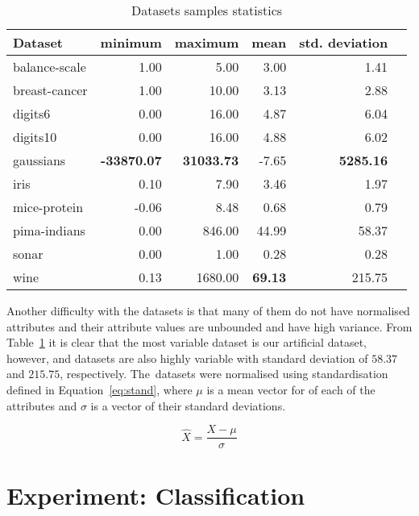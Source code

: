 \begin{table}[ht] \centering
\begin{tabular}{lrrrrr}
\hline
Dataset & minimum & maximum & mean & std. deviation \\
\hline
balance-scale           & 1.00  & 5.00    & 3.00  & 1.41 \\
breast-cancer           & 1.00  & 10.00   & 3.13  & 2.88 \\
digits6                 & 0.00  & 16.00   & 4.87  & 6.04 \\
digits10                & 0.00  & 16.00   & 4.88  & 6.02 \\
gaussians               & \textbf{-33870.07} & \textbf{31033.73} & -7.65 & \textbf{5285.16} \\
iris                    & 0.10  & 7.90    & 3.46  & 1.97 \\
mice-protein            & -0.06 & 8.48    & 0.68  & 0.79 \\
pima-indians            & 0.00  & 846.00  & 44.99 & 58.37 \\
sonar                   & 0.00  & 1.00    & 0.28  & 0.28 \\
wine                    & 0.13  & 1680.00 & \textbf{69.13} & 215.75 \\
\hline
\end{tabular}
\caption{Datasets samples statistics} \label{tab:datasets-samples}
\end{table}

Another difficulty with the datasets is that many of them do not have normalised attributes and their attribute values are unbounded and have high variance. From Table~\ref{tab:datasets-samples} it is clear that the most variable dataset is our artificial  dataset, however,  and  datasets are also highly variable with  standard deviation of $58.37$ and $215.75$, respectively. The~datasets were normalised using standardisation defined in Equation~\ref{eq:stand}, where $\mu$ is a mean vector for of each of the attributes and $\sigma$ is a vector of their standard deviations.

\begin{equation} \label{eq:stand}
\hat{X} = \frac{X-\mu}{\sigma}
\end{equation}

\section{Experiment: Classification} \label{chap:exp:classification}

